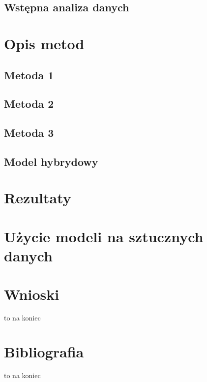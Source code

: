 \documentclass{article}
\begin{document}
\subsection{Wstępna analiza danych}

\section{Opis metod}
\subsection{Metoda 1}
\subsection{Metoda 2}
\subsection{Metoda 3}
\subsection{Model hybrydowy}
\section{Rezultaty}
\section{Użycie modeli na sztucznych danych}
\section{Wnioski}
to na koniec
\section{Bibliografia}
to na koniec
\end{document}
